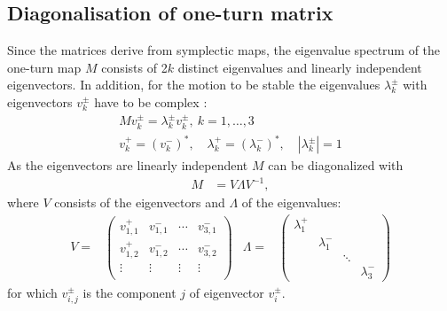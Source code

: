 \documentclass[english]{article}
\begin{document}
\subsection{Diagonalisation of one-turn matrix}
\label{opt:sec:1}
Since the matrices derive from symplectic maps, the eigenvalue spectrum of the one-turn map $M$ consists of 2$k$ distinct eigenvalues and linearly independent eigenvectors. In addition, for the motion to be stable the eigenvalues $\lambda_k^{\pm}$ with eigenvectors $v_k^{\pm}$ have to be complex \cite{willeke88}:
\begin{align}
M v_k^\pm  =  \lambda_k^\pm v_k^\pm, \ k=1,\ldots, 3 \\
v_k^+=(v_k^-)^*, \quad \lambda_k^+=(\lambda_k^-)^*, \quad |\lambda_k^{\pm}|=1
\end{align}
As the eigenvectors are linearly independent $M$ can be diagonalized with
\begin{align}
M &= V \Lambda V^{-1},
\end{align}
where $V$ consists of the eigenvectors and $\Lambda$ of the eigenvalues:
\begin{align}
V=&\left(
\begin{array}{cccc}
v^+_{1,1} & v^-_{1,1} & \cdots & v^-_{3,1}\\
v^+_{1,2} & v^-_{1,2} & \cdots & v^-_{3,2}\\
\vdots    & \vdots    & \vdots & \vdots \\
\end{array}
\right)  &
\Lambda=&\left(
\begin{array}{cccc}
\lambda^+_1 &    & &\\
& \lambda^-_1 & &\\
& & \ddots & \\
& & & \lambda^-_3
\end{array}
\right)
\end{align}
for which $v^{\pm}_{i,j}$ is the component $j$ of eigenvector $v_i^{\pm}$.
\end{document}
